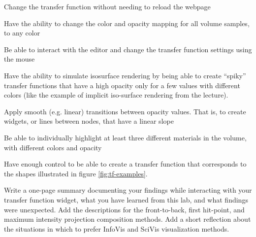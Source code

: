 \documentclass{labinstructions}
\begin{document}
\begin{todolist}
  \begin{todolist}
    \item Change the transfer function without needing to reload the webpage
    \item Have the ability to change the color and opacity mapping for all volume samples, to any color
    \item Be able to interact with the editor and change the transfer function settings using the mouse
    \item Have the ability to simulate isosurface rendering by being able to create ``spiky'' transfer functions that have a high opacity only for a few values with different colors (like the example of implicit iso-surface rendering from the lecture).
    \item Apply smooth (e.g. linear) transitions between opacity values. That is, to create widgets, or lines between nodes, that have a linear slope
    \item Be able to individually highlight at least three different materials in the volume, with different colors and opacity
    \item Have enough control to be able to create a transfer function that corresponds to the shapes illustrated in figure \ref{fig:tf-examples}.
  \end{todolist}
  \item Write a one-page summary documenting your findings while interacting with your transfer function widget, what you have learned from this lab, and what findings were unexpected.  Add the descriptions for the front-to-back, first hit-point, and maximum intensity projection composition methods.  Add a short reflection about the situations in which to prefer InfoVis and SciVis visualization methods.
\end{todolist}
\end{document}
